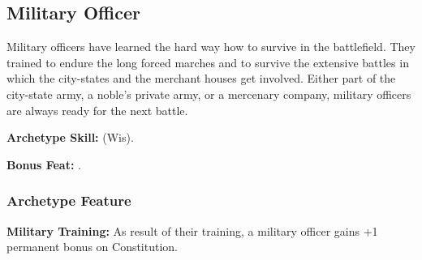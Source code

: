 \subsection{Military Officer}
Military officers have learned the hard way how to survive in the battlefield. They trained to endure the long forced marches and to survive the extensive battles in which the city-states and the merchant houses get involved. Either part of the city-state army, a noble's private army, or a mercenary company, military officers are always ready for the next battle.

\textbf{Archetype Skill:}  (Wis).

\textbf{Bonus Feat:} .

\subsubsection{Archetype Feature}
\textbf{Military Training:} As result of their training, a military officer gains +1 permanent bonus on Constitution.

